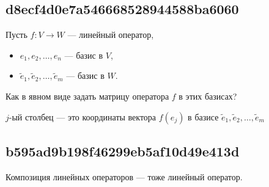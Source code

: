 \documentclass[11pt, a5paper]{article}
\newenvironment{note}[1]{\goodbreak\par\subsection{\hfill \color{lightgray}\tiny #1}}{}
\newenvironment{cloze}[2][\ldots]{\begin{leftbar}}{\end{leftbar}}
\newenvironment{icloze}[2][\ldots]{%
  \ignorespaces\text{\tiny \color{lightgray} \{\{c#2:: }%
}{%
  \text{\tiny \color{lightgray}\}\}}\unskip%
}
\begin{document}
\begin{note}{d8ecf4d0e7a546668528944588ba6060}
    Пусть \( f : V \to W \) --- линейный оператор,
    \begin{itemize}
        \item \( e_1, e_2, \ldots, e_n  \) --- базис в \( V \),
        \item \( \tilde e_1, \tilde e_2, \ldots, \tilde e_m  \) --- базис в \( W \).
    \end{itemize}
    Как в явном виде задать матрицу оператора \( f \) в этих базисах?

    \begin{cloze}{1}
        \( j \)-ый столбец --- это координаты вектора \( f(e_j) \) в базисе \( \tilde e_1, \tilde e_2, \ldots, \tilde e_m \)
    \end{cloze}
\end{note}

\begin{note}{b595ad9b198f46299eb5af10d49e413d}
    Композиция линейных операторов --- тоже \begin{icloze}{1}линейный оператор.\end{icloze}
\end{note}
\end{document}
